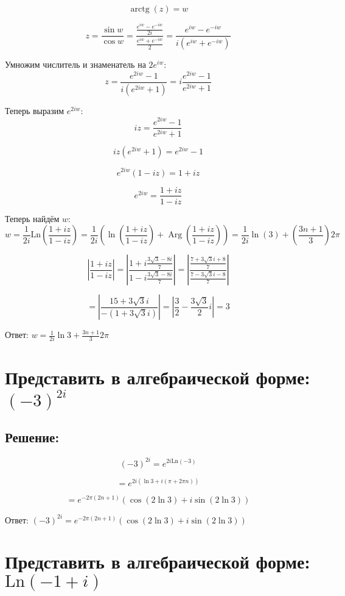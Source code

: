 \documentclass{article}
\begin{document}
\[
\operatorname{arc tg}(z) = w
\]

\[
z = \frac{\sin w}{\cos w} = \frac{\frac{e^{iw} - e^{-iw}}{2i}}{\frac{e^{iw} + e^{-iw}}{2}} = \frac{e^{iw} - e^{-iw}}{i(e^{iw} + e^{-iw})}
\]

Умножим числитель и знаменатель на $2e^{iw}$:
\[
z = \frac{e^{2iw} - 1}{i(e^{2iw} + 1)} = i \frac{e^{2iw} - 1}{e^{2iw} + 1}
\]

Теперь выразим $e^{2iw}$:
\[
i z = \frac{e^{2iw} - 1}{e^{2iw} + 1}
\]

\[
i z (e^{2iw} + 1) = e^{2iw} - 1
\]

\[
e^{2iw} (1 - iz) = 1 + iz
\]

\[
e^{2iw} = \frac{1 + iz}{1 - iz}
\]

Теперь найдём $w$:
\[
w = \frac{1}{2i} \text{Ln} \left( \frac{1 + iz}{1 - iz} \right) = \frac{1}{2i} \left(\ln \left( \frac{1 + iz}{1 - iz} \right) + \operatorname{Arg} \left( \frac{1 + iz}{1 - iz}\right) \right) = \frac{1}{2i} \ln(3) + \left(\frac{3n + 1}{3}\right)2\pi
\]

\[
\left| \frac{1 + iz}{1 - iz} \right| = \left| \frac{1 + i \frac{3\sqrt{3} - 8i}{7}}{1 - i \frac{3\sqrt{3} - 8i}{7}} \right| = \left| \frac{\frac{7 + 3\sqrt{3}i + 8}{7}}{\frac{7 - 3\sqrt{3}i - 8}{7}} \right|
\]

\[
= \left| \frac{15 + 3\sqrt{3}i}{-(1 + 3\sqrt{3}i)} \right| = \left|\frac{3}{2} -\frac{3\sqrt{3}}{2}i \right| = 3
\]


Ответ:
$
w = \frac{1}{2i} \ln{3} + \frac{3n + 1}{3}2\pi
$

\section{Представить в алгебраической форме: $(-3)^{2i}$}
\subsection{Решение:}

\[
(-3)^{2i} = e^{2i \text{Ln}(-3)}
\]

\[
= e^{2i (\ln 3 + i (\pi + 2\pi n))}
\]

\[
 = e^{-2\pi (2n+1)} \left( \cos(2 \ln 3) + i \sin(2 \ln 3) \right)
\]

Ответ:
$
(-3)^{2i} = e^{-2\pi (2n+1)} \left( \cos(2 \ln 3) + i \sin(2 \ln 3) \right)
$

\section{Представить в алгебраической форме: $\text{Ln}(-1 + i)$}
\end{document}
